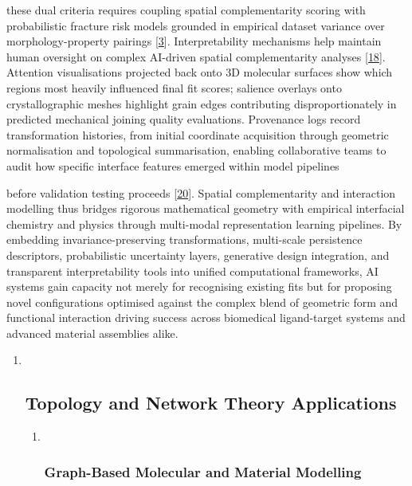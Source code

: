 \documentclass[
]{article}
\begin{document}
these dual criteria requires coupling spatial complementarity scoring
with probabilistic fracture risk models grounded in empirical dataset
variance over morphology-property pairings
{[}\protect\hyperlink{_bookmark43}{3}{]}. Interpretability mechanisms
help maintain human oversight on complex AI-driven spatial
complementarity analyses {[}\protect\hyperlink{_bookmark58}{18}{]}.
Attention visualisations projected back onto 3D molecular surfaces show
which regions most heavily influenced final fit scores; salience
overlays onto crystallographic meshes highlight grain edges contributing
disproportionately in predicted mechanical joining quality evaluations.
Provenance logs record transformation histories, from initial coordinate
acquisition through geometric normalisation and topological
summarisation, enabling collaborative teams to audit how specific
interface features emerged within model pipelines

before validation testing proceeds
{[}\protect\hyperlink{_bookmark60}{20}{]}. Spatial complementarity and
interaction modelling thus bridges rigorous mathematical geometry with
empirical interfacial chemistry and physics through multi-modal
representation learning pipelines. By embedding invariance-preserving
transformations, multi-scale persistence descriptors, probabilistic
uncertainty layers, generative design integration, and transparent
interpretability tools into unified computational frameworks, AI systems
gain capacity not merely for recognising existing fits but for proposing
novel configurations optimised against the complex blend of geometric
form and functional interaction driving success across biomedical
ligand-target systems and advanced material assemblies alike.

\begin{enumerate}
\def\labelenumi{\arabic{enumi}.}
\setcounter{enumi}{1}
\item ~
  \hypertarget{topology-and-network-theory-applications}{%
  \subsection{Topology and Network Theory
  Applications}\label{topology-and-network-theory-applications}}

  \begin{enumerate}
  \def\labelenumii{\arabic{enumii}.}
  \item ~
    \hypertarget{graph-based-molecular-and-material-modelling}{%
    \subsubsection{Graph-Based Molecular and Material
    Modelling}\label{graph-based-molecular-and-material-modelling}}
  \end{enumerate}
\end{enumerate}
\end{document}
